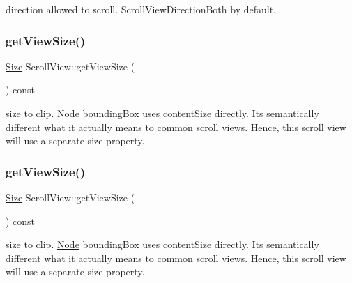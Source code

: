 direction allowed to scroll. Scroll\+View\+Direction\+Both by default. \mbox{\label{classScrollView_a84b4e4eb00a0877a2b2e71e3f1792b68}} 
\subsubsection{\texorpdfstring{get\+View\+Size()}{getViewSize()}\hspace{0.1cm}{\footnotesize\ttfamily [1/2]}}
{\footnotesize\ttfamily \hyperlink{classSize}{Size} Scroll\+View\+::get\+View\+Size (\begin{DoxyParamCaption}{ }\end{DoxyParamCaption}) const\hspace{0.3cm}{\ttfamily [inline]}}

size to clip. \hyperlink{classNode}{Node} bounding\+Box uses content\+Size directly. It\textquotesingle{}s semantically different what it actually means to common scroll views. Hence, this scroll view will use a separate size property. \mbox{\label{classScrollView_a84b4e4eb00a0877a2b2e71e3f1792b68}} 
\subsubsection{\texorpdfstring{get\+View\+Size()}{getViewSize()}\hspace{0.1cm}{\footnotesize\ttfamily [2/2]}}
{\footnotesize\ttfamily \hyperlink{classSize}{Size} Scroll\+View\+::get\+View\+Size (\begin{DoxyParamCaption}{ }\end{DoxyParamCaption}) const\hspace{0.3cm}{\ttfamily [inline]}}

size to clip. \hyperlink{classNode}{Node} bounding\+Box uses content\+Size directly. It\textquotesingle{}s semantically different what it actually means to common scroll views. Hence, this scroll view will use a separate size property. \mbox{\label{classScrollView_a9eedb1e4515a77abc80fcfacb4638474}} 

